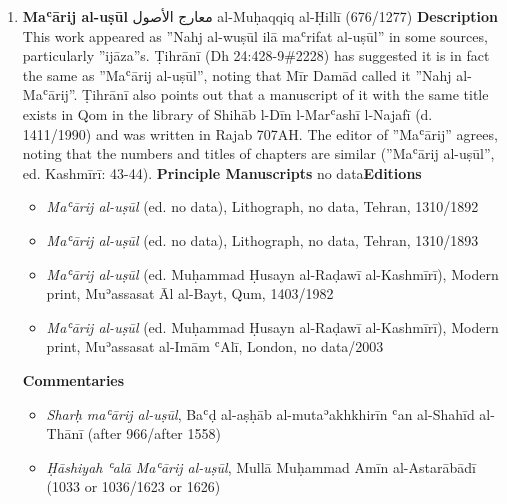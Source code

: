 \documentclass{article}
\begin{document}
\begin{enumerate}
      \item \textbf{Maʿārij al-uṣūl}
        \newline
        \textarabic{معارج الأصول}
        \newline
        al-Muḥaqqiq al-Ḥillī
        \newline
        (676/1277)
        \newline
        \newline
        \textbf{Description}
        \newline	
        This work appeared as ''Nahj al-wuṣūl ilā maʿrifat al-uṣūl'' in some sources, particularly ''ijāza''s. Ṭihrānī (Dh 24:428-9\#2228) has suggested it is in fact the same as ''Maʿārij al-uṣūl'', noting that Mīr Damād called it ''Nahj al-Maʿārij''. Ṭihrānī also points out that a manuscript of it with the same title exists in Qom in the library of Shihāb l-Dīn l-Marʿashī l-Najafī (d. 1411/1990) and was written in Rajab 707AH. The editor of ''Maʿārij'' agrees, noting that the numbers and titles of chapters are similar (''Maʿārij al-uṣūl'', ed. Kashmīrī: 43-44).
        \newline
        \newline
    \textbf{Principle Manuscripts}
\newline
no data\newline\textbf{Editions}
\begin{itemize}
        \item \emph{Maʿārij al-uṣūl} (ed. no data), Lithograph, no data, Tehran, 1310/1892
        
        \item \emph{Maʿārij al-uṣūl} (ed. no data), Lithograph, no data, Tehran, 1310/1893
        
        \item \emph{Maʿārij al-uṣūl} (ed. Muḥammad Ḥusayn al-Raḍawī al-Kashmīrī), Modern print, Muʾassasat Āl al-Bayt, Qum, 1403/1982
        
        \item \emph{Maʿārij al-uṣūl} (ed. Muḥammad Ḥusayn al-Raḍawī al-Kashmīrī), Modern print, Muʾassasat al-Imām ʿAlī, London, no data/2003
        \end{itemize}
\textbf{Commentaries}
\begin{itemize}
              \item \emph{Sharḥ maʿārij al-uṣūl}, Baʿḍ al-aṣḥāb al-mutaʾakhkhirīn ʿan al-Shahīd al-Thānī (after 966/after 1558)
            
              \item \emph{Ḥāshiyah ʿalā Maʿārij al-uṣūl}, Mullā Muḥammad Amīn al-Astarābādī (1033 or 1036/1623 or 1626)
            

\end{itemize}
\end{enumerate}
\end{document}
